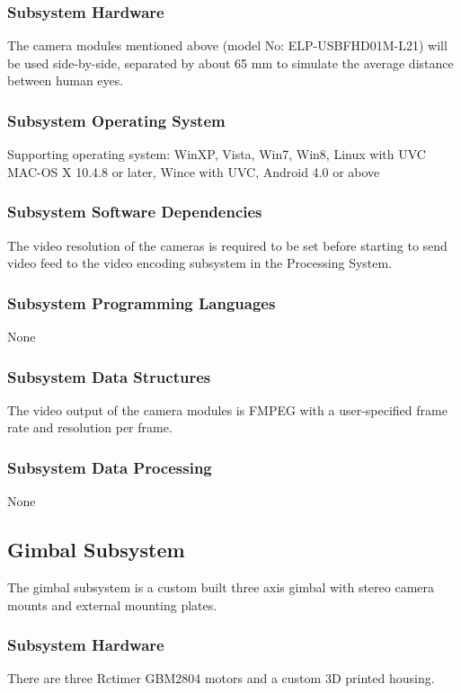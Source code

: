 \subsubsection{Subsystem Hardware}
The camera modules mentioned above (model No: ELP-USBFHD01M-L21) will be used side-by-side, separated by about 65 mm to simulate the average distance between human eyes.

\subsubsection{Subsystem Operating System}
Supporting operating system: WinXP, Vista, Win7, Win8, Linux with UVC MAC-OS X 10.4.8 or later, Wince with UVC, Android 4.0 or above

\subsubsection{Subsystem Software Dependencies}
The video resolution of the cameras is required to be set before starting to send video feed to the video encoding subsystem in the Processing System.

\subsubsection{Subsystem Programming Languages}
None

\subsubsection{Subsystem Data Structures}
The video output of the camera modules is FMPEG with a user-specified frame rate and resolution per frame.

\subsubsection{Subsystem Data Processing}
None

\subsection{Gimbal Subsystem}
The gimbal subsystem is a custom built three axis gimbal with stereo camera mounts and external mounting plates.

\subsubsection{Subsystem Hardware}
There are three Rctimer GBM2804 motors and a custom 3D printed housing.

